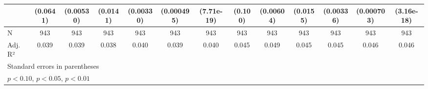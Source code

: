 {\begin{tabular}{l*{12}{c}}
                    &    (0.0641)         &   (0.00530)         &    (0.0141)         &   (0.00330)         &  (0.000495)         &  (7.71e-19)         &     (0.100)         &   (0.00604)         &    (0.0155)         &   (0.00336)         &  (0.000703)         &  (3.16e-18)         \\
\hline
N                   &         943         &         943         &         943         &         943         &         943         &         943         &         943         &         943         &         943         &         943         &         943         &         943         \\
Adj. R²             &       0.039         &       0.039         &       0.038         &       0.040         &       0.039         &       0.040         &       0.045         &       0.049         &       0.045         &       0.045         &       0.046         &       0.046         \\
\hline\hline
\multicolumn{13}{l}{\footnotesize Standard errors in parentheses}\\
\multicolumn{13}{l}{\footnotesize \sym{*} \(p<0.10\), \sym{**} \(p<0.05\), \sym{***} \(p<0.01\)}\\
\end{tabular}
}
